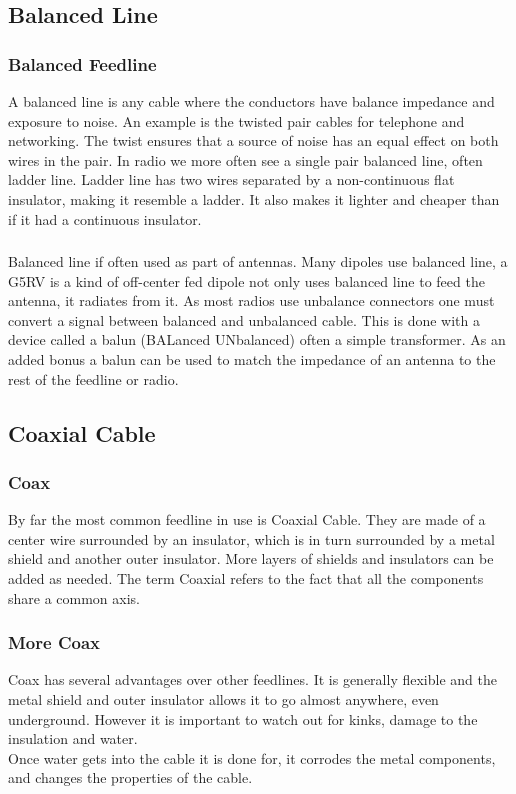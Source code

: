 \documentclass[10pt, handout]{beamer}
\begin{document}
\subsection{Balanced Line}

\begin{frame}
\frametitle{Balanced Feedline}
A balanced line is any cable where the conductors have balance impedance and exposure to noise. An example is the twisted pair cables for telephone and networking. The twist ensures that a source of noise has an equal effect on both wires in the pair. In radio we more often see a single pair balanced line, often ladder line. Ladder line has two wires separated by a non-continuous flat insulator, making it resemble a ladder. It also makes it lighter and cheaper than if it had a continuous insulator.
\end{frame}

\begin{frame}
\frametitle{}
Balanced line if often used as part of antennas. Many dipoles use balanced line, a G5RV is a kind of off-center fed dipole not only uses balanced line to feed the antenna, it radiates from it. 
As most radios use unbalance connectors one must convert a signal between balanced and unbalanced cable. This is done with a device called a balun (BALanced UNbalanced) often a simple transformer. As an added bonus a balun can be used to match the impedance of an antenna to the rest of the feedline or radio.
\end{frame}

\subsection{Coaxial Cable}

\begin{frame}
\frametitle{Coax}
By far the most common feedline in use is Coaxial Cable. They are made of a center wire surrounded by an insulator, which is in turn surrounded by a metal shield and another outer insulator. More layers of shields and insulators can be added as needed. The term Coaxial refers to the fact that all the components share a common axis.
\end{frame}

\begin{frame}
\frametitle{More Coax}
Coax has several advantages over other feedlines. It is generally flexible and the metal shield and outer insulator allows it to go almost anywhere, even underground. However it is important to watch out for kinks, damage to the insulation and water.\\
Once water gets into the cable it is done for, it corrodes the metal components, and changes the properties of the cable.
\end{frame}
\end{document}
